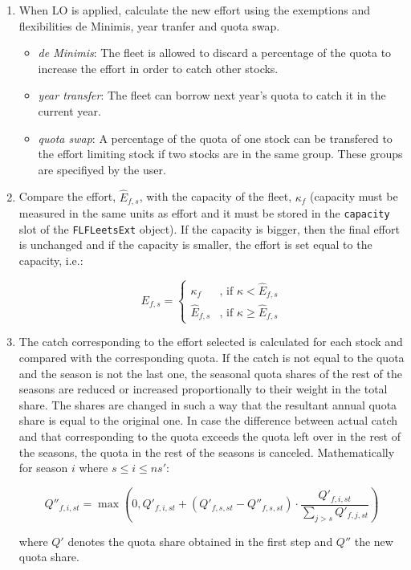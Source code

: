 \begin{enumerate}
	\item When LO is applied, calculate the new effort using the exemptions and flexibilities de Minimis, 
	  year tranfer and quota swap. 
	  \begin{itemize}
  		\item \textit{de Minimis}: The fleet is allowed to discard a percentage of the quota to increase the effort 
  		  in order to catch other stocks.
  		\item \textit{year transfer}: The fleet can borrow next year's quota to catch it in the current year.
  		\item \textit{quota swap}: A percentage of the quota of one stock can be transfered to the effort 
  		  limiting stock if two stocks are in the same group. These groups are specifiyed by the user.
	  \end{itemize}		
		
  \item Compare the effort, $\hat{E}_{f,s}$, with the capacity of the fleet, $\kappa_f$  
    (capacity must be measured in the same units as effort and it must be stored in the \texttt{capacity} slot 
    of the \texttt{FLFLeetsExt} object). 
		If the capacity is bigger, then the final effort is unchanged and if the capacity is smaller, 
		the effort is set equal to the capacity, i.e.:
	
	\begin{equation}	
			E_{f,s} =
  				\begin{cases}
  				 	\kappa_f			 & \text{, if } \kappa < \hat{E}_{f,s}\\
   					\hat{E}_{f,s}  & \text{, if } \kappa \geq \hat{E}_{f,s}
  				\end{cases}
	\end{equation}	 
	
	\item The catch corresponding to the effort selected is calculated for each stock and compared with the 
	  corresponding quota. 
		If the catch is not equal to the quota and the season is not the last one, 
		the seasonal quota shares of the rest of the seasons are reduced or increased 
		proportionally to their weight in the total share. The shares are changed 
		in such a way that the resultant annual quota share is equal to the original one.
		In case the difference between actual catch and that corresponding to the quota exceeds
		the quota left over in the rest of the seasons, the quota in the rest of the seasons is
		canceled.	Mathematically for season $i$ where $s \leq i \leq ns'$: 
		
	\begin{equation}
		Q''_{f,i,st} =  \max\left( 0,Q'_{f,i,st} + (Q'_{f,s,st} - Q''_{f,s,st}) \cdot 
		                \frac{Q'_{f,i,st}}{\sum_{j>s} Q'_{f,j,st}}\right) 
	\end{equation}
		
		\noindent where $Q'$ denotes the quota share obtained in the first step and $Q''$ the new quota share. 
	
\end{enumerate}

